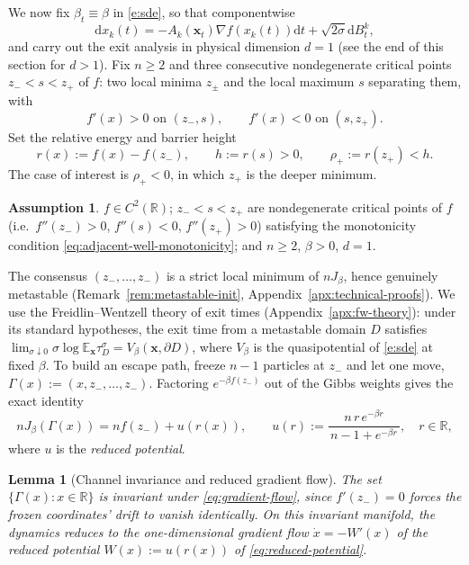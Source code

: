 \documentclass{article} %
\newcommand{\dd}{\mathrm d}
\theoremstyle{plain}
\newtheorem{lemma}[theorem]{Lemma}
\theoremstyle{definition}
\newtheorem{assumption}[theorem]{Assumption}
\theoremstyle{remark}
\newcommand{\prefactor}[2]{A_{#1}(#2)}
\newcommand{\xx}{\mathbf{x}}
\newcommand{\R}{\mathbb{R}}
\newcommand{\E}{\mathbb{E}}
\begin{document}
We now fix $\beta_t\equiv\beta$ in \eqref{e:sde}, so that componentwise
\begin{equation}
    \dd x_k(t) = -\prefactor{k}{\xx_t}\nabla f(x_k(t))\dd t + \sqrt{2\sigma}\dd B_t^k,
    \label{eq:softmin-langevin}
\end{equation}
and carry out the exit analysis in physical dimension $d=1$ (see the end of this section for $d>1$). Fix $n\ge2$ and three consecutive nondegenerate critical points $z_-<s<z_+$ of $f$: two local minima $z_\pm$ and the local maximum $s$ separating them, with
\begin{equation}
    f'(x)>0 \text{ on } (z_-,s), \qquad f'(x)<0 \text{ on } (s,z_+).
    \label{eq:adjacent-well-monotonicity}
\end{equation}
Set the relative energy and barrier height
\begin{equation}
    r(x):=f(x)-f(z_-), \qquad h:=r(s)>0, \qquad \rho_+:=r(z_+)<h.
    \label{eq:relative-energy}
\end{equation}
The case of interest is $\rho_+<0$, in which $z_+$ is the deeper minimum.

\begin{assumption}
\label{assum:channel}
$f\in C^2(\R)$; $z_-<s<z_+$ are nondegenerate critical points of $f$ (i.e.\ $f''(z_-)>0$, $f''(s)<0$, $f''(z_+)>0$) satisfying the monotonicity condition \eqref{eq:adjacent-well-monotonicity}; and $n\ge2$, $\beta>0$, $d=1$.
\end{assumption}

The consensus $(z_-,\dots,z_-)$ is a strict local minimum of $nJ_\beta$, hence genuinely metastable (Remark~\ref{rem:metastable-init}, Appendix~\ref{apx:technical-proofs}). We use the Freidlin--Wentzell theory of exit times (Appendix~\ref{apx:fw-theory}): under its standard hypotheses, the exit time from a metastable domain $D$ satisfies $\lim_{\sigma\downarrow0}\sigma\log \E_{\xx}\tau_D^\sigma=V_\beta(\xx,\partial D)$, where $V_\beta$ is the quasipotential of \eqref{e:sde} at fixed $\beta$. To build an escape path, freeze $n-1$ particles at $z_-$ and let one move, $\Gamma(x):=(x,z_-,\dots,z_-)$. Factoring $e^{-\beta f(z_-)}$ out of the Gibbs weights gives the exact identity
\begin{equation}
    nJ_\beta(\Gamma(x))=nf(z_-)+u(r(x)), \qquad u(r):=\frac{n\,r\,e^{-\beta r}}{\,n-1+e^{-\beta r}\,}, \quad r\in\R,
    \label{eq:reduced-potential}
\end{equation}
where $u$ is the \emph{reduced potential}.

\begin{lemma}[Channel invariance and reduced gradient flow]
\label{lem:channel-invariant}
The set $\{\Gamma(x):x\in\R\}$ is invariant under \eqref{eq:gradient-flow}, since $f'(z_-)=0$ forces the frozen coordinates' drift to vanish identically. On this invariant manifold, the dynamics reduces to the one-dimensional gradient flow $\dot x=-W'(x)$ of the reduced potential $W(x):=u(r(x))$ of \eqref{eq:reduced-potential}.
\end{lemma}
\end{document}
